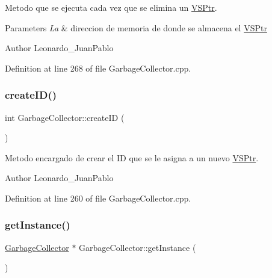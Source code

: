 Metodo que se ejecuta cada vez que se elimina un \hyperlink{class_v_s_ptr}{V\+S\+Ptr}. 


\begin{DoxyParams}{Parameters}
{\em La} & direccion de memoria de donde se almacena el \hyperlink{class_v_s_ptr}{V\+S\+Ptr} \\
\hline
\end{DoxyParams}
\begin{DoxyAuthor}{Author}
Leonardo\+\_\+\+Juan\+Pablo 
\end{DoxyAuthor}


Definition at line 268 of file Garbage\+Collector.\+cpp.

\mbox{\label{class_garbage_collector_ae58afa45c7554355f2536229db34613c}} 
\subsubsection{\texorpdfstring{create\+I\+D()}{createID()}}
{\footnotesize\ttfamily int Garbage\+Collector\+::create\+ID (\begin{DoxyParamCaption}{ }\end{DoxyParamCaption})\hspace{0.3cm}{\ttfamily [static]}}



Metodo encargado de crear el ID que se le asigna a un nuevo \hyperlink{class_v_s_ptr}{V\+S\+Ptr}. 

\begin{DoxyAuthor}{Author}
Leonardo\+\_\+\+Juan\+Pablo 
\end{DoxyAuthor}


Definition at line 260 of file Garbage\+Collector.\+cpp.

\mbox{\label{class_garbage_collector_ade4bccdf41223cc395b646db3f60ac8b}} 
\subsubsection{\texorpdfstring{get\+Instance()}{getInstance()}}
{\footnotesize\ttfamily \hyperlink{class_garbage_collector}{Garbage\+Collector} $\ast$ Garbage\+Collector\+::get\+Instance (\begin{DoxyParamCaption}{ }\end{DoxyParamCaption})\hspace{0.3cm}{\ttfamily [static]}}



